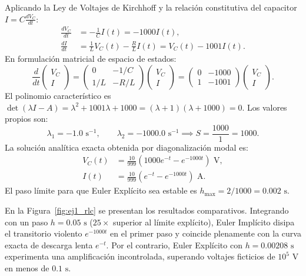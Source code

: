 \documentclass[11pt,a4paper]{article}
\begin{document}
Aplicando la Ley de Voltajes de Kirchhoff y la relación constitutiva del capacitor $I = C \frac{dV_C}{dt}$:
\begin{align}
    \frac{dV_C}{dt} &= -\frac{1}{C} I(t) = -1000 I(t), \\
    \frac{dI}{dt} &= \frac{1}{L} V_C(t) - \frac{R}{L} I(t) = V_C(t) - 1001 I(t).
\end{align}
En formulación matricial de espacio de estados:
\begin{equation}
    \frac{d}{dt}\begin{pmatrix} V_C \\ I \end{pmatrix} =
    \begin{pmatrix} 0 & -1/C \\ 1/L & -R/L \end{pmatrix}
    \begin{pmatrix} V_C \\ I \end{pmatrix} =
    \begin{pmatrix} 0 & -1000 \\ 1 & -1001 \end{pmatrix}
    \begin{pmatrix} V_C \\ I \end{pmatrix}.
\end{equation}
El polinomio característico es $\det(\lambda I - A) = \lambda^2 + 1001\lambda + 1000 = (\lambda + 1)(\lambda + 1000) = 0$. Los valores propios son:
\begin{equation}
    \lambda_1 = -1.0\text{ s}^{-1}, \qquad \lambda_2 = -1000.0\text{ s}^{-1} \implies S = \frac{1000}{1} = 1000.
\end{equation}
La solución analítica exacta obtenida por diagonalización modal es:
\begin{align}
    V_C(t) &= \frac{10}{999}\left( 1000 e^{-t} - e^{-1000t} \right)\text{ V}, \\
    I(t)   &= \frac{10}{999}\left( e^{-t} - e^{-1000t} \right)\text{ A}.
\end{align}
El paso límite para que Euler Explícito sea estable es $h_{\max} = 2/1000 = 0.002\text{ s}$. 

En la Figura~\ref{fig:ej1_rlc} se presentan los resultados comparativos. Integrando con un paso $h = 0.05\text{ s}$ ($25\times$ superior al límite explícito), Euler Implícito disipa el transitorio violento $e^{-1000t}$ en el primer paso y coincide plenamente con la curva exacta de descarga lenta $e^{-t}$. Por el contrario, Euler Explícito con $h = 0.00208\text{ s}$ experimenta una amplificación incontrolada, superando voltajes ficticios de $10^5\text{ V}$ en menos de $0.1\text{ s}$.
\end{document}
